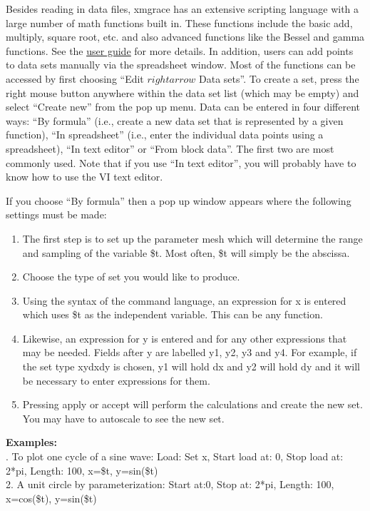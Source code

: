 \documentclass[byrevtex,amssymb,aps,pra,floatfix,letterpaper]{revtex4}
\begin{document}
Besides reading in data files, xmgrace has an extensive scripting language with a large number of math functions built in. These functions include the basic add, multiply, square root, etc. and also advanced functions like the Bessel and gamma functions.  See the \href{http://plasma-gate.weizmann.ac.il/Grace/doc/UsersGuide.html}{\underline{user guide}} for more details. In addition, users can add points to data sets manually via the spreadsheet window. Most of the functions can be accessed by first choosing ``Edit $rightarrow$ Data sets''. To create a set, press the right mouse button anywhere within the data set list (which may be empty) and select ``Create new'' from the pop up menu. Data can be entered in four different ways: ``By formula'' (i.e., create a new data set that is represented by a given function), ``In spreadsheet'' (i.e., enter the individual data points using a spreadsheet), ``In text editor'' or ``From block data''. The first two are most commonly used. Note that if you use ``In text editor'', you will probably have to know how to use the VI text editor.

If you choose ``By formula'' then a pop up window appears where the following settings must be made:

\begin{enumerate}
\item The first step is to set up the parameter mesh which will determine the range and sampling of the variable \$t. Most often, \$t will simply be the abscissa.
\item Choose the type of set you would like to produce.
\item Using the syntax of the command language, an expression for x is entered which uses \$t as the independent variable. This can be any function.
\item Likewise, an expression for y is entered and for any other expressions that may be needed. Fields after y are labelled y1, y2, y3 and y4. For example, if the set type xydxdy is chosen, y1 will hold dx and y2 will hold dy and it will be necessary to enter expressions for them.
\item Pressing apply or accept will perform the calculations and create the new set. You may have to autoscale to see the new set.
\end{enumerate}

\noindent
\textbf{Examples:}\\

. To plot one cycle of a sine wave: Load: Set x, Start load at: 0, Stop load at: 2*pi, Length: 100, x=\$t, y=sin(\$t)\\
2. A unit circle by parameterization: Start at:0, Stop at: 2*pi, Length: 100, x=cos(\$t), y=sin(\$t)\\
\end{document}

